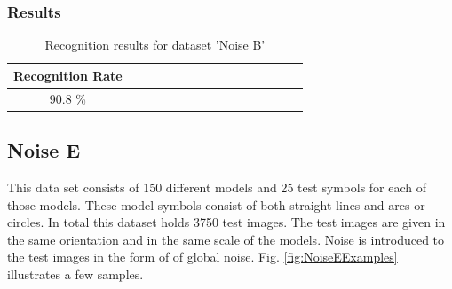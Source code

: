 \subsubsection{Results}
\begin{table}[H]
\centering
\caption{Recognition results for dataset 'Noise B'}
\begin{tabular}{ccccccccccccccc}
  \hline
      Recognition Rate \\
  \hline
      90.8 \% \\
  \hline
\end{tabular}
\end{table}
\vspace{65mm}

\subsection{Noise E}    
This data set consists of 150 different models and 25 test symbols for each of those models. These model symbols consist of both straight lines and arcs or circles. In total this dataset holds 3750 test images. The test images are given in the same orientation and in the same scale of the models. Noise is introduced to the test images in the form of of global noise. Fig. \ref{fig:NoiseEExamples} illustrates a few samples.
    
